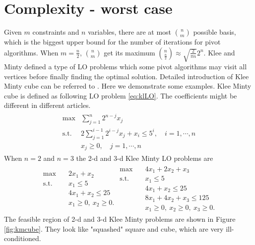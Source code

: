 \documentclass[11pt]{article}
\begin{document}
\section{Complexity - worst case}
Given $m$ constraints and $n$ variables, there are at most $\binom{n}{m}$ possible basis, which is the biggest upper bound for the number of iterations for pivot algorithms. When $m=\frac{n}{2}$, $\binom{n}{m}$ get its maximum $\binom{n}{\frac{n}{2}}\approx \sqrt{\frac{2}{\pi n}}2^n$. Klee and Minty defined a type of LO problems which some pivot algorithms may visit all vertices before finally finding the optimal solution. Detailed introduction of Klee Minty cube can be referred to \cite{vanderbei2020linear}. Here we demonstrate some examples. Klee Minty cube is defined as following LO problem \ref{eq:klLO}. The coefficients might be different in different articles. 
\begin{align}
\begin{split}
\max &\sum_{j=1}^n 2^{n-j}x_j \\
\text{s.t. } & 2\sum_{j=1}^{i-1}2^{i-j}x_j + x_i \le 5^i, \quad i=1,\cdots,n\\
			&x_j \ge 0,  \quad j=1,\cdots,n
\end{split}\label{eq:klLO}
\end{align} 
When $n=2$ and $n=3$ the 2-d and 3-d Klee Minty LO problems are 
\begin{align*}
\begin{split}
\max \quad & 2x_1 + x_2 \\
\text{s.t. }\quad  & x_1 \le 5\\
& 4x_1 + x_2 \le 25\\
& x_1 \ge 0,\ x_2 \ge 0.
\end{split}
\begin{split}
\max \quad & 4x_1 + 2x_2 + x_3 \\
\text{s.t. }\quad  & x_1 \le 5\\
& 4x_1 + x_2 \le 25\\
& 8x_1 + 4x_2 + x_3 \le 125\\
& x_1 \ge 0,\ x_2 \ge 0, \ x_3 \ge 0.
\end{split}
\end{align*}
The feasible region of 2-d and 3-d Klee Minty problems are shown in Figure \ref{fig:kmcube}. They look like "squashed" square and cube, which are very ill-conditioned.
\end{document}

